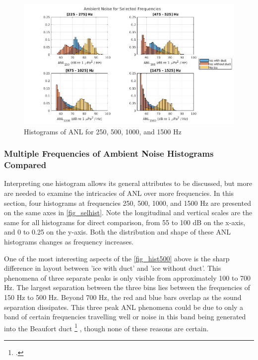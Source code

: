 \begin{figure}[p]
\centering
\includegraphics[scale=0.45]{Figures/selected_hists.jpg}
\caption{Histograms of ANL for 250, 500, 1000, and 1500 Hz}
\label{fig_selhist}
\end{figure}

\subsubsection{Multiple Frequencies of Ambient Noise Histograms Compared}
Interpreting one histogram allows its general attributes to be discussed, but more are needed to examine the intricacies of ANL over more frequencies.  In this section, four histograms at frequencies 250, 500, 1000, and 1500 Hz are presented on the same axes in \autoref{fig_selhist}. Note the longitudinal and vertical scales are the same for all histograms for direct comparison, from 55 to 100 dB on the x-axis, and 0 to 0.25 on the y-axis. Both the distribution and shape of these ANL histograms changes as frequency increases. 


One of the most interesting aspects of the \autoref{fig_hist500} above is the sharp difference in layout between 'ice with duct' and 'ice without duct'. This phenomena of three separate peaks is only visible from approximately 100 to 700 Hz. The largest separation between the three bins lies between the frequencies of 150 Hz to 500 Hz. Beyond 700 Hz, the red and blue bars overlap as the sound separation dissipates. This three peak ANL phenomena could be due to only a band of certain frequencies travelling well or noise in this band being generated into the Beaufort duct \footcite{beaufortduct} , though none of these reasons are certain.

